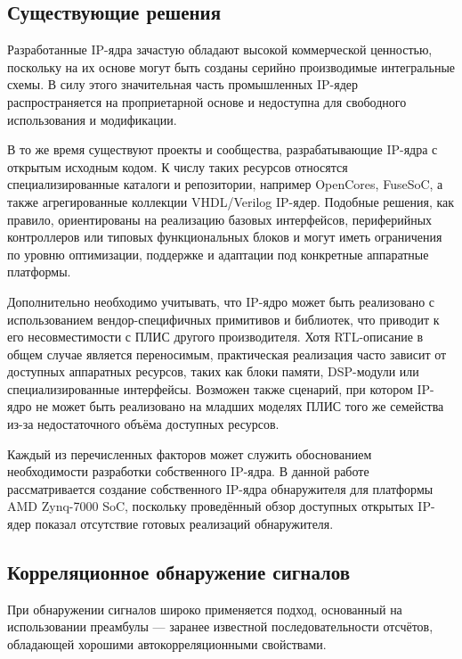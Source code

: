 \subsection{Существующие решения}

Разработанные IP-ядра зачастую обладают высокой коммерческой ценностью, поскольку на их основе могут быть созданы серийно производимые интегральные схемы. В силу этого значительная часть промышленных IP-ядер распространяется на проприетарной основе и недоступна для свободного использования и модификации. 

В то же время существуют проекты и сообщества, разрабатывающие IP-ядра с открытым исходным кодом. К числу таких ресурсов относятся специализированные каталоги и репозитории, например OpenCores\cite{opencores_home}, FuseSoC\cite{fusesoc_dir}, а также агрегированные коллекции VHDL/Verilog IP-ядер\cite{ip_cores_collection}. Подобные решения, как правило, ориентированы на реализацию базовых интерфейсов, периферийных контроллеров или типовых функциональных блоков и могут иметь ограничения по уровню оптимизации, поддержке и адаптации под конкретные аппаратные платформы.

Дополнительно необходимо учитывать, что IP-ядро может быть реализовано с использованием вендор-специфичных примитивов и библиотек, что приводит к его несовместимости с ПЛИС другого производителя. Хотя RTL-описание в общем случае является переносимым, практическая реализация часто зависит от доступных аппаратных ресурсов, таких как блоки памяти, DSP-модули или специализированные интерфейсы. Возможен также сценарий, при котором IP-ядро не может быть реализовано на младших моделях ПЛИС того же семейства из-за недостаточного объёма доступных ресурсов.

Каждый из перечисленных факторов может служить обоснованием необходимости разработки собственного IP-ядра. В данной работе рассматривается создание собственного IP-ядра обнаружителя для платформы AMD Zynq-7000 SoC\cite{zynq7000}, поскольку проведённый обзор доступных открытых IP-ядер показал отсутствие готовых реализаций обнаружителя.




\subsection{Корреляционное обнаружение сигналов}

При обнаружении сигналов широко применяется подход, основанный на использовании преамбулы — заранее известной последовательности отсчётов, обладающей хорошими автокорреляционными свойствами. 

